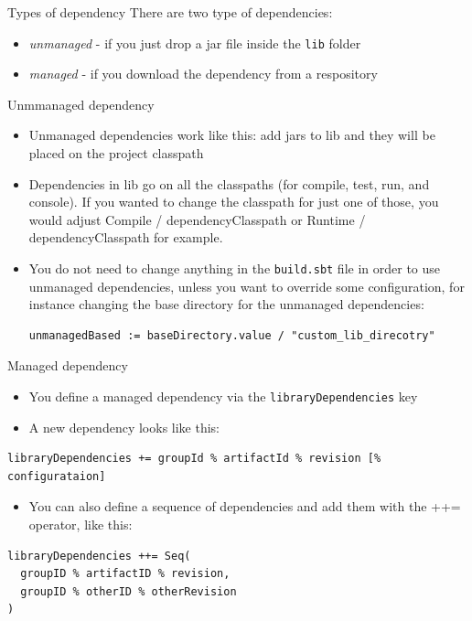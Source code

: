 \documentclass[presentation, aspectratio=169]{beamer}
\begin{document}
\begin{frame}[label={sec:org643938d},fragile]{Types of dependency}
 There are two type of dependencies:
\begin{itemize}
\item \emph{unmanaged} - if you just drop a jar file inside the \texttt{lib} folder
\item \emph{managed} - if you download the dependency from a respository
\end{itemize}
\end{frame}
\begin{frame}[label={sec:org21dbeff},fragile]{Unmmanaged dependency}
 \begin{itemize}
\item Unmanaged dependencies work like this: add jars to lib and they will be placed on the project classpath
\item Dependencies in lib go on all the classpaths (for compile, test, run, and console). 
If you wanted to change the classpath for just one of those, 
you would adjust Compile / dependencyClasspath or Runtime / dependencyClasspath for example.
\item You do not need to change anything in the \texttt{build.sbt} file in order to use unmanaged dependencies,
unless you want to override some configuration, for instance changing the base directory for the 
unmanaged dependencies:
\begin{verbatim}
unmanagedBased := baseDirectory.value / "custom_lib_direcotry"
\end{verbatim}
\end{itemize}
\end{frame}

\begin{frame}[label={sec:orgb2f9c11},fragile]{Managed dependency}
 \begin{itemize}
\item You define a managed dependency via the \texttt{libraryDependencies} key
\item A new dependency looks like this:
\end{itemize}
\tiny
\begin{verbatim}
libraryDependencies += groupId % artifactId % revision [% configurataion]
\end{verbatim}
\large
\begin{itemize}
\item You can also define a sequence of dependencies and add them with the ++= operator, like this:
\end{itemize}
\tiny
\begin{verbatim}
libraryDependencies ++= Seq(
  groupID % artifactID % revision,
  groupID % otherID % otherRevision
)
\end{verbatim}
\end{frame}
\end{document}
